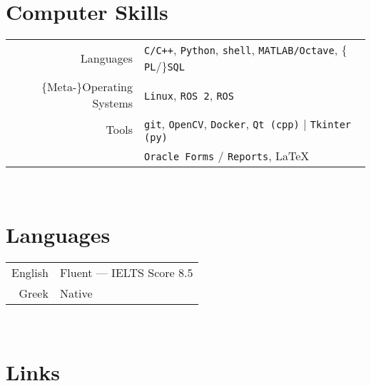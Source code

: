 \documentclass[a4paper,10pt,twoside]{article}
\begin{document}
\section{Computer Skills}

\begin{tabular}{rp{12cm}}
Languages & \texttt{C/C++}, \texttt{Python}, \texttt{shell}, \texttt{MATLAB/Octave}, $\{$\texttt{PL}/$\}$\texttt{SQL}\\
$\{$Meta-$\}$Operating Systems & \texttt{Linux}, \texttt{ROS 2}, \texttt{ROS} \\
Tools & \texttt{git}, \texttt{OpenCV}, \texttt{Docker}, \texttt{Qt (cpp)} | \texttt{Tkinter (py)}\\
      & \texttt{Oracle Forms} / \texttt{Reports}, \LaTeX\\
\end{tabular} \\



\section{Languages}

\begin{tabular}{rp{12cm}}
English & Fluent --- IELTS Score $8.5$ \\
Greek & Native \\
\end{tabular} \\


\section{Links}
\end{document}
